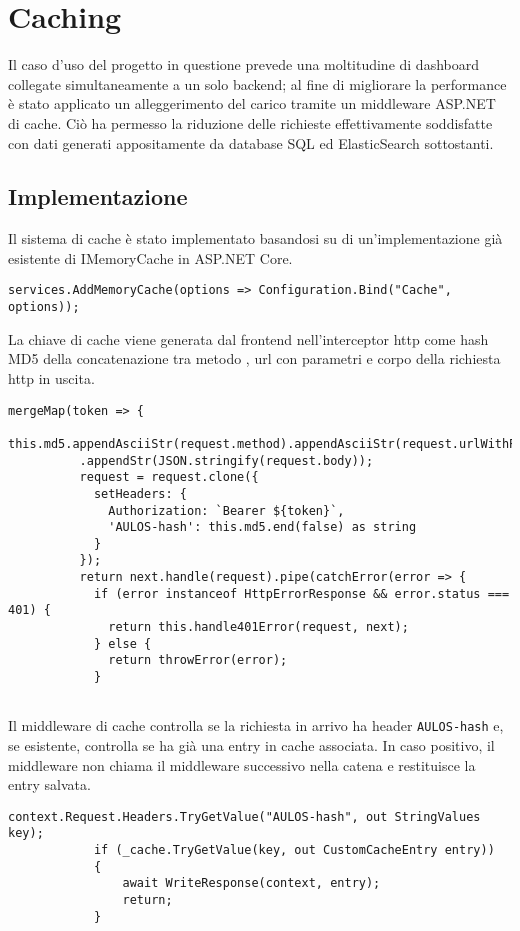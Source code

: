 \chapter{Caching}
\label{ch:caching}
Il caso d'uso del progetto in questione prevede una moltitudine di dashboard collegate simultaneamente a un solo backend; al fine di  migliorare la performance è stato applicato un alleggerimento del carico tramite un middleware ASP.NET di cache. Ciò ha permesso la riduzione delle richieste effettivamente soddisfatte con dati generati appositamente da database SQL ed ElasticSearch sottostanti.
\section{Implementazione}
Il sistema di cache è stato implementato basandosi su di un'implementazione già esistente di IMemoryCache in ASP.NET Core. \cite{MemCache}
\begin{lstlisting}[caption={Startup.cs, Memory Cache Injection}, style=javaScriptCode]
services.AddMemoryCache(options => Configuration.Bind("Cache", options));
\end{lstlisting}

La chiave di cache viene generata dal frontend nell'interceptor http come hash MD5 \cite{MD5} della concatenazione tra metodo \cite{HTTPMETHODS}, url con parametri \cite{HTTPPARAMS} e corpo \cite{HTTPBODY} della richiesta http in uscita.
\begin{lstlisting}[caption={Http Interceptor, line 28}, style=javaScriptCode]
mergeMap(token => {
          this.md5.appendAsciiStr(request.method).appendAsciiStr(request.urlWithParams)
          .appendStr(JSON.stringify(request.body));
          request = request.clone({
            setHeaders: {
              Authorization: `Bearer ${token}`,
              'AULOS-hash': this.md5.end(false) as string
            }
          });
          return next.handle(request).pipe(catchError(error => {
            if (error instanceof HttpErrorResponse && error.status === 401) {
              return this.handle401Error(request, next);
            } else {
              return throwError(error);
            }
          
\end{lstlisting}

Il middleware di cache controlla se la richiesta in arrivo ha header \verb|AULOS-hash| e, se esistente, controlla se ha già una entry in cache associata. In caso positivo, il middleware non chiama il middleware successivo nella catena e restituisce la entry salvata.
\begin{lstlisting}[caption={TotallyOriginalCachingMiddleware.cs, Cache hit scenario}, style=javaScriptCode]
context.Request.Headers.TryGetValue("AULOS-hash", out StringValues key);
            if (_cache.TryGetValue(key, out CustomCacheEntry entry))
            {
                await WriteResponse(context, entry);
                return;
            }
\end{lstlisting}

